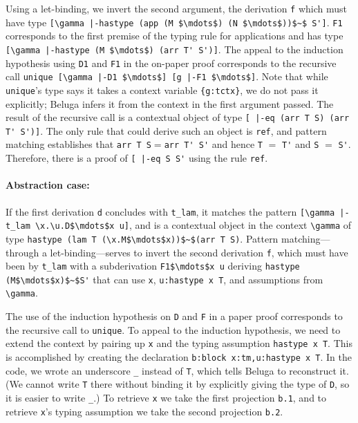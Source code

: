 Using a let-binding, we invert the second
argument, the derivation \lstinline{f} which 
must have type
\lstinline![\gamma |-hastype (app (M $\mdots$) (N $\mdots$))$~$ S']!. \lstinline!F1!
corresponds to the first premise of the typing rule for applications
and has type \lstinline![\gamma |-hastype (M $\mdots$) (arr T' S')]!.
The appeal to the induction hypothesis using \lstinline{D1} and \lstinline{F1} in the
on-paper proof 
corresponds to the recursive call
 \lstinline!unique [\gamma |-D1 $\mdots$] [g |-F1 $\mdots$]!.
Note that while \lstinline!unique!'s type says it takes a context variable \lstinline!{g:tctx}!,
we do not pass it explicitly; Beluga infers it from the context in the first argument
passed. 
The result of the recursive call is a contextual object of type 
\lstinline![ |-eq (arr T S) (arr T' S')]!. The only rule that
could derive such an object is \lstinline{ref}, and pattern matching
establishes that \lstinline!arr T S!$=$\lstinline!arr T' S'! and hence
\lstinline!T! $=$ \lstinline!T'! and \lstinline!S! $=$ \lstinline!S'!.
Therefore, there is a proof of \lstinline![ |-eq S S'! using the
rule \lstinline!ref!.

 \paragraph{Abstraction case:}
  If the first derivation \lstinline{d} concludes with \lstinline{t_lam}, it matches
 the pattern \lstinline{[\gamma |-t_lam \x.\u.D$\mdots$x u]}, and is
 a contextual object in the context \lstinline!\gamma! of type 
 \lstinline{hastype (lam T (\x.M$\mdots$x))$~$(arr T S)}.
 Pattern matching---through a let-binding---serves to invert the second derivation \lstinline{f}, which
 must have been by \lstinline{t_lam} with a subderivation
 \lstinline{F1$\mdots$x u} deriving \lstinline{hastype (M$\mdots$x)$~$S'} that can use \lstinline{x},
 \lstinline{u:hastype x T}, and assumptions from \lstinline!\gamma!.

 The use of the induction hypothesis on \lstinline{D} and \lstinline{F} in a paper proof
 corresponds to the recursive call to \lstinline{unique}.  To appeal to the
 induction hypothesis, we need to extend the context by pairing up \lstinline{x} and
 the typing assumption \lstinline!hastype x T!. This is accomplished by creating
 the declaration \lstinline!b:block x:tm,u:hastype x T!.  In the
 code, we wrote an underscore \lstinline!_! instead of \lstinline{T},
 which tells Beluga to reconstruct it.  (We cannot write \lstinline{T} there without binding it by
 explicitly giving the type of \lstinline{D}, so it is easier to write \lstinline!_!.)
 To retrieve \lstinline{x} we take the first projection
 \lstinline{b.1}, and to retrieve \lstinline{x}'s typing assumption we take the second projection \lstinline{b.2}.
 
